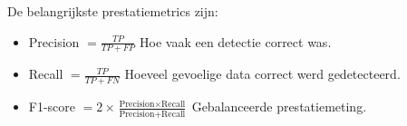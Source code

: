De belangrijkste prestatiemetrics zijn:
\begin{itemize}
    \item Precision \( = \frac{TP}{TP + FP} \) Hoe vaak een detectie correct was.
    \item Recall \( = \frac{TP}{TP + FN} \) Hoeveel gevoelige data correct werd gedetecteerd.
    \item F1-score \( = 2 \times \frac{\text{Precision} \times \text{Recall}}{\text{Precision} + \text{Recall}} \) Gebalanceerde prestatiemeting.
\end{itemize}









